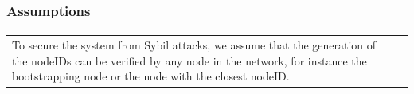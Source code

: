 \begin{frame}
\frametitle{Assumptions}
\framesubtitle{}
\begin{table}
\begin{tabular}{p{7cm}p{3cm}}
To secure the system from Sybil attacks, we assume that the generation of the nodeIDs can
be verified by any node in the network, for instance the bootstrapping node or
the node with the closest nodeID.

&
\vspace{1.5cm}
\end{tabular}
\end{table}
\end{frame}

